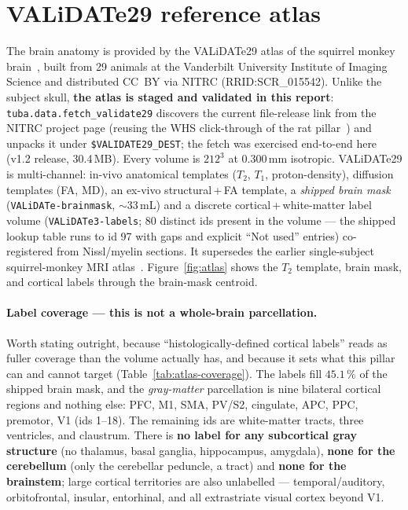 \documentclass{compactarticle}
\begin{document}
\section{VALiDATe29 reference atlas}
\label{sec:atlas}

The brain anatomy is provided by the VALiDATe29 atlas of the squirrel
monkey brain~\cite{validate29}, built from 29 animals at the Vanderbilt
University Institute of Imaging Science and distributed CC~BY via NITRC
(RRID:SCR\_015542). Unlike the subject skull, \textbf{the atlas is
staged and validated in this report}: \texttt{tuba.data.fetch\_validate29}
discovers the current file-release link from the NITRC project page
(reusing the WHS click-through of the rat pillar~\cite{tuba-rat}) and
unpacks it under \texttt{\$VALIDATE29\_DEST}; the fetch was exercised
end-to-end here (v1.2 release, 30.4\,MB). Every volume is $212^3$ at
0.300\,mm isotropic. VALiDATe29 is multi-channel: in-vivo anatomical
templates ($T_2$, $T_1$, proton-density), diffusion templates (FA, MD),
an ex-vivo structural\,+\,FA template, a \emph{shipped brain mask}
(\texttt{VALiDATe-brainmask}, ${\sim}33$\,mL) and a discrete
cortical\,+\,white-matter label volume (\texttt{VALiDATe3-labels};
80 distinct ids present in the volume --- the shipped lookup table runs
to id 97 with gaps and explicit ``Not used'' entries) co-registered from
Nissl/myelin sections. It supersedes the earlier single-subject
squirrel-monkey MRI atlas~\cite{gao-2014}.
Figure~\ref{fig:atlas} shows the $T_2$ template, brain mask, and
cortical labels through the brain-mask centroid.

\paragraph{Label coverage --- this is not a whole-brain parcellation.}
Worth stating outright, because ``histologically-defined cortical
labels'' reads as fuller coverage than the volume actually has, and
because it sets what this pillar can and cannot target
(Table~\ref{tab:atlas-coverage}). The labels fill $45.1\,\%$ of the
shipped brain mask, and the \emph{gray-matter} parcellation is nine
bilateral cortical regions and nothing else: PFC, M1, SMA, PV/S2,
cingulate, APC, PPC, premotor, V1 (ids 1--18). The remaining ids are
white-matter tracts, three ventricles, and claustrum. There is
\textbf{no label for any subcortical gray structure} (no thalamus,
basal ganglia, hippocampus, amygdala), \textbf{none for the cerebellum}
(only the cerebellar peduncle, a tract) and \textbf{none for the
brainstem}; large cortical territories are also unlabelled ---
temporal/auditory, orbitofrontal, insular, entorhinal, and all
extrastriate visual cortex beyond V1.
\end{document}
